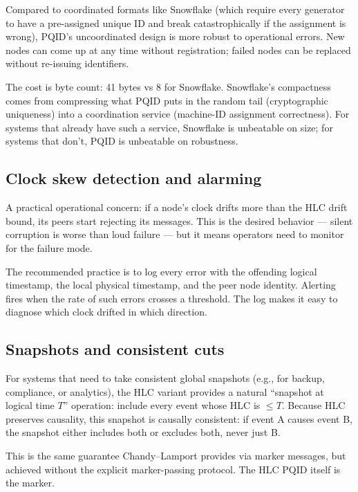Compared to coordinated formats like Snowflake \citep{snowflake} (which require every generator to have a pre-assigned unique ID and break catastrophically if the assignment is wrong), PQID's uncoordinated design is more robust to operational errors. New nodes can come up at any time without registration; failed nodes can be replaced without re-issuing identifiers.

The cost is byte count: 41 bytes vs 8 for Snowflake. Snowflake's compactness comes from compressing what PQID puts in the random tail (cryptographic uniqueness) into a coordination service (machine-ID assignment correctness). For systems that already have such a service, Snowflake is unbeatable on size; for systems that don't, PQID is unbeatable on robustness.

\subsection{Clock skew detection and alarming}

A practical operational concern: if a node's clock drifts more than the HLC drift bound, its peers start rejecting its messages. This is the desired behavior --- silent corruption is worse than loud failure --- but it means operators need to monitor for the failure mode.

The recommended practice is to log every  error with the offending logical timestamp, the local physical timestamp, and the peer node identity. Alerting fires when the rate of such errors crosses a threshold. The log makes it easy to diagnose which clock drifted in which direction.

\subsection{Snapshots and consistent cuts}

For systems that need to take consistent global snapshots (e.g., for backup, compliance, or analytics), the HLC variant provides a natural ``snapshot at logical time $T$'' operation: include every event whose HLC is $\leq T$. Because HLC preserves causality, this snapshot is causally consistent: if event A causes event B, the snapshot either includes both or excludes both, never just B.

This is the same guarantee Chandy--Lamport \citep{chandylamport1985} provides via marker messages, but achieved without the explicit marker-passing protocol. The HLC PQID itself is the marker.

